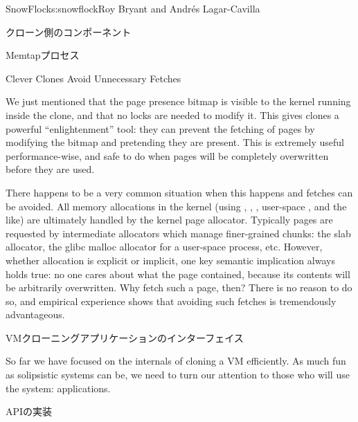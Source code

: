 \begin{aosachapter}{SnowFlock}{s:snowflock}{Roy Bryant and Andr\'e{s} Lagar-Cavilla}
\begin{aosasect1}{クローン側のコンポーネント}
\begin{aosasect2}{Memtapプロセス}
\end{aosasect2}

\begin{aosasect2}{Clever Clones Avoid Unnecessary Fetches}

We just mentioned that the page presence bitmap is visible to the
kernel running inside the clone, and that no locks are needed to
modify it. This gives clones a powerful ``enlightenment'' tool: they can prevent the
fetching of pages by modifying the bitmap and pretending they are
present. This is extremely useful performance-wise, and safe to do
when pages will be completely overwritten before they are used.

There happens to be a very common situation when this happens and
fetches can be avoided. All memory allocations in the kernel (using
, , ,
user-space , and the like) are ultimately
handled by the kernel page allocator. Typically pages are requested by
intermediate allocators which manage finer-grained chunks: the slab
allocator, the glibc malloc allocator for a user-space process,
etc. However, whether allocation is explicit or implicit,
one key semantic implication
always holds true: no one cares about what the page contained,
because its contents will be arbitrarily overwritten. Why
fetch such a page, then? There is no reason to do so, and empirical
experience shows that avoiding such fetches is tremendously
advantageous.

\end{aosasect2}

\end{aosasect1}

\begin{aosasect1}{VMクローニングアプリケーションのインターフェイス}

So far we have focused on the internals of cloning a VM
efficiently. As much fun as solipsistic systems can be, we need to
turn our attention to those who will use the system: applications.

\begin{aosasect2}{APIの実装}


\end{aosasect2}
\end{aosasect1}
\end{aosachapter}
